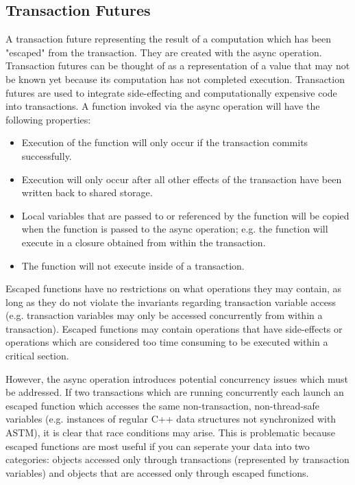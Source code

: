 \documentclass[conference]{IEEEtran}
\begin{document}
\subsection{Transaction Futures}

A transaction future representing the result of a computation which has been "escaped" from the transaction. They are created with the async operation. Transaction futures can be thought of as a representation of a value that may not be known yet because its computation has not completed execution.
Transaction futures are used to integrate side-effecting and computationally expensive code into transactions. A function invoked via the async operation will have the following properties:

\begin{itemize}
\item Execution of the function will only occur if the transaction commits successfully.
\item Execution will only occur after all other effects of the transaction have been written back to shared storage.
\item Local variables that are passed to or referenced by the function will be copied when the function is passed to the async operation; e.g. the function will execute in a closure obtained from within the transaction.
\item The function will not execute inside of a transaction.
\end{itemize}

Escaped functions have no restrictions on what operations they may contain, as long as they do not violate the invariants regarding transaction variable access (e.g. transaction variables may only be accessed concurrently from within a transaction). Escaped functions may contain operations that have side-effects or operations which are considered too time consuming to be executed within a critical section.

However, the async operation introduces potential concurrency issues which must be addressed. If two transactions which are running concurrently each launch an escaped function which accesses the same non-transaction, non-thread-safe variables (e.g. instances of regular C++ data structures not synchronized with ASTM), it is clear that race conditions may arise. This is problematic because escaped functions are most useful if you can seperate your data into two categories: objects accessed only through transactions (represented by transaction variables) and objects that are accessed only through escaped functions.
\end{document}
